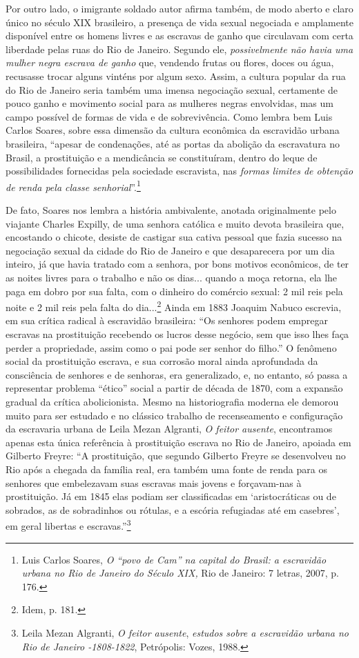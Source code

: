 Por outro lado, o imigrante soldado autor afirma também, de modo aberto
e claro único no século XIX brasileiro, a presença de vida sexual
negociada e amplamente disponível entre os homens livres e as escravas
de ganho que circulavam com certa liberdade pelas ruas do Rio de
Janeiro. Segundo ele, \emph{possivelmente não havia uma mulher negra
escrava de ganho} que, vendendo frutas ou flores, doces ou água,
recusasse trocar alguns vinténs por algum sexo. Assim, a cultura popular
da rua do Rio de Janeiro seria também uma imensa negociação sexual,
certamente de pouco ganho e movimento social para as mulheres negras
envolvidas, mas um campo possível de formas de vida e de sobrevivência.
Como lembra bem Luis Carlos Soares, sobre essa dimensão da cultura
econômica da escravidão urbana brasileira, ``apesar de condenações, até
as portas da abolição da escravatura no Brasil, a prostituição e a
mendicância se constituíram, dentro do leque de possibilidades
fornecidas pela sociedade escravista, nas \emph{formas limites de
obtenção de renda pela classe senhorial}''.\footnote{Luis Carlos Soares,
  \emph{O ``povo de Cam'' na capital do Brasil: a escravidão urbana no
  Rio de Janeiro do Século XIX,} Rio de Janeiro: 7 letras, 2007, p. 176.}

De fato, Soares nos lembra a história ambivalente, anotada originalmente
pelo viajante Charles Expilly, de uma senhora católica e muito devota
brasileira que, encostando o chicote, desiste de castigar sua cativa
pessoal que fazia sucesso na negociação sexual da cidade do Rio de
Janeiro e que desaparecera por um dia inteiro, já que havia tratado com
a senhora, por bons motivos econômicos, de ter as noites livres para o
trabalho e não os dias... quando a moça retorna, ela lhe paga em dobro
por sua falta, com o dinheiro do comércio sexual: 2 mil reis pela noite
e 2 mil reis pela falta do dia...\footnote{Idem, p. 181.} Ainda em 1883
Joaquim Nabuco escrevia, em sua crítica radical à escravidão brasileira:
``Os senhores podem empregar escravas na prostituição recebendo os
lucros desse negócio, sem que isso lhes faça perder a propriedade, assim
como o pai pode ser senhor do filho.'' O fenômeno social da prostituição
escrava, e sua corrosão moral ainda aprofundada da consciência de
senhores e de senhoras, era generalizado, e, no entanto, só passa a
representar problema ``ético'' social a partir de década de 1870, com a
expansão gradual da crítica abolicionista. Mesmo na historiografia
moderna ele demorou muito para ser estudado e no clássico trabalho de
recenseamento e configuração da escravaria urbana de Leila Mezan
Algranti, \emph{O feitor ausente}, encontramos apenas esta única
referência à prostituição escrava no Rio de Janeiro, apoiada em Gilberto
Freyre: ``A prostituição, que segundo Gilberto Freyre se desenvolveu no
Rio após a chegada da família real, era também uma fonte de renda para
os senhores que embelezavam suas escravas mais jovens e forçavam-nas à
prostituição. Já em 1845 elas podiam ser classificadas em
`aristocráticas ou de sobrados, as de sobradinhos ou rótulas, e a
escória refugiadas até em casebres', em geral libertas e
escravas.''\footnote{Leila Mezan Algranti, \emph{O feitor ausente},
  \emph{estudos sobre a escravidão urbana no Rio de Janeiro -1808-1822},
  Petrópolis: Vozes, 1988.}

